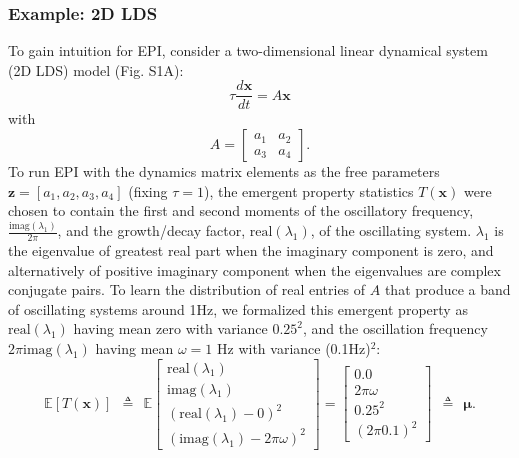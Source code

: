 \documentclass[11pt]{article}
\begin{document}
\subsubsection{Example: 2D LDS}\label{methods_2DLDS}
To gain intuition for EPI, consider a two-dimensional linear dynamical system (2D LDS) model (Fig. S1A):
\begin{equation} 
\tau \frac{d\mathbf{x}}{dt} = A\mathbf{x}
\end{equation}
with
\begin{equation}
A = \begin{bmatrix} a_1 & a_2 \\ a_3 & a_4 \end{bmatrix}.
\end{equation}
To run EPI with the dynamics matrix elements as the free parameters $\mathbf{z} = [ a_1, a_2, a_3, a_4]$ (fixing $\tau=1$), the emergent property statistics $T(\mathbf{x})$ were chosen to contain the first and second moments of the oscillatory frequency, $\frac{\text{imag}(\lambda_1)}{2 \pi}$, and the growth/decay factor, $\text{real}(\lambda_1)$, of the oscillating system. 
 $\lambda_1$ is the eigenvalue of greatest real part when the imaginary component is zero, and alternatively of positive imaginary component when the eigenvalues are complex conjugate pairs.  
To learn the distribution of real entries of $A$ that produce a band of oscillating systems around 1Hz, we formalized this emergent property as $\text{real}(\lambda_1)$ having mean zero with variance $0.25^2$, and the oscillation frequency $2 \pi \text{imag}(\lambda_1)$ having mean $\omega = 1$ Hz with variance (0.1Hz)$^2$:
\begin{equation}
 \mathbb{E}\left[T(\mathbf{x}) \right] ~~ \triangleq ~~ \mathbb{E} \begin{bmatrix} \text{real}(\lambda_1) \\ \text{imag}(\lambda_1) \\ (\text{real}(\lambda_1)-0)^2  \\ (\text{imag}(\lambda_1)-2 \pi \omega)^2 \end{bmatrix} = \begin{bmatrix} 0.0 \\ 2 \pi \omega \\ 0.25^2 \\ (2 \pi 0.1)^2 \end{bmatrix} ~~ \triangleq ~~ \bm{\mu}.
 \end{equation} 
\end{document}
